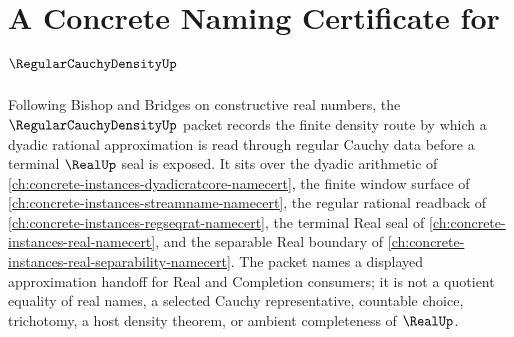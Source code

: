 \chapter{A Concrete Naming Certificate for $\RegularCauchyDensityUp$}
\label{ch:concrete-instances-regular-cauchy-density-namecert}

Following Bishop and Bridges on constructive real numbers, the
$\RegularCauchyDensityUp$ packet records the finite density route by which a
dyadic rational approximation is read through regular Cauchy data before a
terminal $\RealUp$ seal is exposed. It sits over the dyadic arithmetic of
\autoref{ch:concrete-instances-dyadicratcore-namecert}, the finite window
surface of \autoref{ch:concrete-instances-streamname-namecert}, the regular
rational readback of \autoref{ch:concrete-instances-regseqrat-namecert}, the
terminal Real seal of \autoref{ch:concrete-instances-real-namecert}, and the
separable Real boundary of
\autoref{ch:concrete-instances-real-separability-namecert}. The packet names a
displayed approximation handoff for Real and Completion consumers; it is not a
quotient equality of real names, a selected Cauchy representative, countable
choice, trichotomy, a host density theorem, or ambient completeness of
$\RealUp$.

